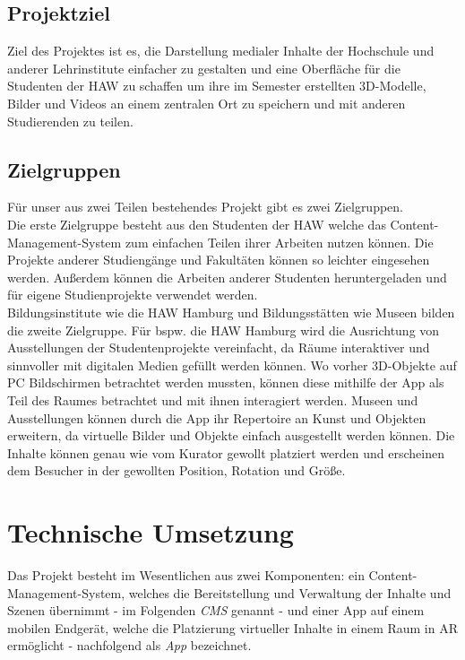 \documentclass[titlepage, a4paper, 11pt]{scrartcl}
\begin{document}
    \subsection{Projektziel}
      Ziel des Projektes ist es, die Darstellung medialer Inhalte der Hochschule und anderer Lehrinstitute einfacher zu gestalten 
      und eine Oberfläche für die Studenten der HAW zu schaffen um ihre im Semester erstellten 3D-Modelle, 
      Bilder und Videos an einem zentralen Ort zu speichern und mit anderen Studierenden zu teilen.

    \subsection{Zielgruppen}
      Für unser aus zwei Teilen bestehendes Projekt gibt es zwei Zielgruppen.\\
      Die erste Zielgruppe besteht aus den Studenten der HAW welche das Content-Management-System zum einfachen Teilen ihrer Arbeiten nutzen können. 
      Die Projekte anderer Studiengänge und Fakultäten können so leichter eingesehen werden. 
      Außerdem können die Arbeiten anderer Studenten heruntergeladen und für eigene Studienprojekte verwendet werden.\\

      Bildungsinstitute wie die HAW Hamburg und Bildungsstätten wie Museen bilden die zweite Zielgruppe. 
      Für bspw. die HAW Hamburg wird die Ausrichtung von Ausstellungen der Studentenprojekte vereinfacht, 
      da Räume interaktiver und sinnvoller mit digitalen Medien gefüllt werden können. 
      Wo vorher 3D-Objekte auf PC Bildschirmen betrachtet werden mussten, können diese mithilfe der App als Teil des Raumes betrachtet und mit ihnen interagiert werden. 
      Museen und Ausstellungen können durch die App ihr Repertoire an Kunst und Objekten erweitern, da virtuelle Bilder und Objekte einfach ausgestellt werden können. 
      Die Inhalte können genau wie vom Kurator gewollt platziert werden und erscheinen dem Besucher in der gewollten Position, Rotation und Größe.

  \section{Technische Umsetzung}
  Das Projekt besteht im Wesentlichen aus zwei Komponenten: 
  ein Content-Management-System, welches die Bereitstellung und Verwaltung der Inhalte und Szenen übernimmt - im Folgenden \textit{CMS} genannt -
  und einer App auf einem mobilen Endgerät, welche die Platzierung virtueller Inhalte in einem Raum in AR ermöglicht - nachfolgend als \textit{App} bezeichnet.\\
  
\end{document}
